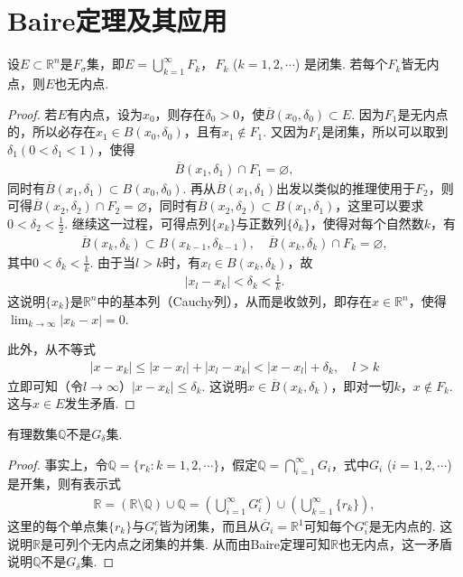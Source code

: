 \documentclass[../../main.tex]{subfiles}%
\begin{document}
\section{Baire定理及其应用}


\begin{theorem}[Baire定理]\label{theorem:Baire定理}
设$E\subset\mathbb{R}^n$是$F_{\sigma}$集，即$E = \bigcup_{k = 1}^{\infty}F_k$，$\,F_k$ ($k = 1,2,\cdots$) 是闭集. 若每个$F_k$皆无内点，则$E$也无内点.
\end{theorem}
\begin{proof}
若$E$有内点，设为$x_0$，则存在$\delta_0>0$，使$\overline{B}(x_0,\delta_0)\subset E$. 因为$F_1$是无内点的，所以必存在$x_1\in B(x_0,\delta_0)$，且有$x_1\notin F_1$. 又因为$F_1$是闭集，所以可以取到$\delta_1(0<\delta_1<1)$，使得
\begin{align*}
\overline{B}(x_1,\delta_1)\cap F_1=\varnothing,
\end{align*}
同时有$\overline{B}(x_1,\delta_1)\subset B(x_0,\delta_0)$. 再从$\overline{B}(x_1,\delta_1)$出发以类似的推理使用于$F_2$，则可得$\overline{B}(x_2,\delta_2)\cap F_2=\varnothing$，同时有$\overline{B}(x_2,\delta_2)\subset B(x_1,\delta_1)$，这里可以要求$0<\delta_2<\frac{1}{2}$. 继续这一过程，可得点列$\{x_k\}$与正数列$\{\delta_k\}$，使得对每个自然数$k$，有
\begin{align*}
\overline{B}(x_k,\delta_k)\subset B(x_{k - 1},\delta_{k - 1}), \quad \overline{B}(x_k,\delta_k)\cap F_k=\varnothing,
\end{align*}
其中$0<\delta_k<\frac{1}{k}$. 由于当$l>k$时，有$x_l\in B(x_k,\delta_k)$，故
\begin{align*}
|x_l - x_k|<\delta_k<\frac{1}{k}.
\end{align*}
这说明$\{x_k\}$是$\mathbb{R}^n$中的基本列（Cauchy列），从而是收敛列，即存在$x\in\mathbb{R}^n$，使得$\lim_{k\to\infty}|x_k - x| = 0$.

此外，从不等式
\begin{align*}
|x - x_k|\leqslant|x - x_l|+|x_l - x_k|<|x - x_l|+\delta_k, \quad l>k
\end{align*}
立即可知（令$l\to\infty$）$|x - x_k|\leqslant\delta_k$. 这说明$x\in\overline{B}(x_k,\delta_k)$，即对一切$k$，$x\notin F_k$. 这与$x\in E$发生矛盾. 
\end{proof}

\begin{example}\label{example:例13}
有理数集$\mathbb{Q}$不是$G_{\delta}$集.
\end{example}
\begin{proof}
事实上，令$\mathbb{Q}=\{r_k: k = 1,2,\cdots\}$，假定$\mathbb{Q}=\bigcap_{i = 1}^{\infty}G_i$，式中$G_i$ ($i = 1,2,\cdots$) 是开集，则有表示式
\begin{align*}
\mathbb{R}=(\mathbb{R}\setminus\mathbb{Q})\cup\mathbb{Q}=\left(\bigcup_{i = 1}^{\infty}G_i^c\right)\cup\left(\bigcup_{k = 1}^{\infty}\{r_k\}\right),
\end{align*}
这里的每个单点集$\{r_k\}$与$G_i^c$皆为闭集，而且从$\overline{G}_i=\mathbb{R}^1$可知每个$G_i^c$是无内点的. 这说明$\mathbb{R}$是可列个无内点之闭集的并集. 从而由Baire定理可知$\mathbb{R}$也无内点，这一矛盾说明$\mathbb{Q}$不是$G_{\delta}$集. 
\end{proof}
\end{document}
